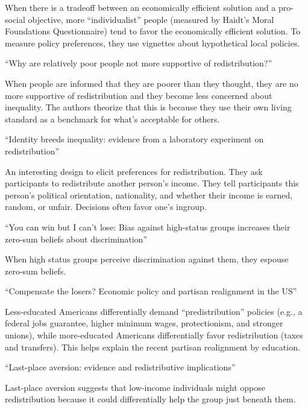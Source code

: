 \documentclass{article}
\begin{document}
When there is a tradeoff between an economically efficient solution and a pro-social objective, more ``individualist'' people (measured by Haidt’s Moral Foundations Questionnaire) tend to favor the economically efficient solution. To measure policy preferences, they use vignettes about hypothetical local policies.

\medskip \noindent \textbf{\cite{hoy2021relatively}} ``Why are relatively poor people not more supportive of redistribution?''

When people are informed that they are poorer than they thought, they are no more supportive of redistribution and they become less concerned about inequality. The authors theorize that this is because they use their own living standard as a benchmark for what's acceptable for others.

\medskip \noindent \textbf{\cite{fischbacher2023identity}} ``Identity breeds inequality: evidence from a laboratory experiment on redistribution''

An interesting design to elicit preferences for redistribution. They ask participants to redistribute another person's income. They tell participants this person's political orientation, nationality, and whether their income is earned, random, or unfair. Decisions often favor one's ingroup. 

\medskip \noindent \textbf{\cite{wilkins2015you}} ``You can win but I can't lose: Bias against high-status groups increases their zero-sum beliefs about discrimination''

When high status groups perceive discrimination against them, they espouse zero-sum beliefs.

\medskip \noindent \textbf{\cite{kuziemko2023compensate}} ``Compensate the losers? Economic policy and partisan realignment in the US''

Less-educated Americans differentially demand ``predistribution'' policies (e.g., a federal jobs guarantee, higher minimum wages, protectionism, and stronger unions), while more-educated Americans differentially favor redistribution (taxes and transfers). This helps explain the recent partisan realignment by education.

\medskip \noindent \textbf{\cite{kuziemko2014last}} ``Last-place aversion: evidence and redistributive implications''

Last-place aversion suggests that low-income individuals might oppose redistribution because it could differentially help the group just beneath them.
\end{document}
